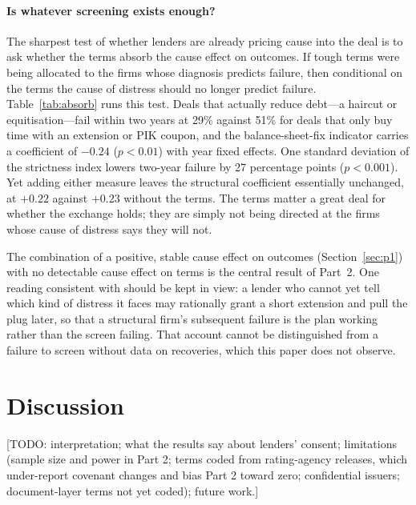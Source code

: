 \documentclass[12pt]{article}
\begin{document}


\paragraph{Is whatever screening exists enough?} The sharpest test of whether lenders are already pricing cause into the deal is to ask whether the terms absorb the cause effect on outcomes. If tough terms were being allocated to the firms whose diagnosis predicts failure, then conditional on the terms the cause of distress should no longer predict failure. Table~\ref{tab:absorb} runs this test. Deals that actually reduce debt---a haircut or equitisation---fail within two years at 29\% against 51\% for deals that only buy time with an extension or PIK coupon, and the balance-sheet-fix indicator carries a coefficient of $-0.24$ ($p < 0.01$) with year fixed effects. One standard deviation of the strictness index lowers two-year failure by 27 percentage points ($p < 0.001$). Yet adding either measure leaves the structural coefficient essentially unchanged, at $+0.22$ against $+0.23$ without the terms. The terms matter a great deal for whether the exchange holds; they are simply not being directed at the firms whose cause of distress says they will not.



The combination of a positive, stable cause effect on outcomes (Section~\ref{sec:p1}) with no detectable cause effect on terms is the central result of Part~2. One reading consistent with \citet{kahl2002} should be kept in view: a lender who cannot yet tell which kind of distress it faces may rationally grant a short extension and pull the plug later, so that a structural firm's subsequent failure is the plan working rather than the screen failing. That account cannot be distinguished from a failure to screen without data on recoveries, which this paper does not observe.

\section{Discussion}
[TODO: interpretation; what the results say about lenders' consent; limitations (sample size and power in Part 2; terms coded from rating-agency releases, which under-report covenant changes and bias Part 2 toward zero; confidential issuers; document-layer terms not yet coded); future work.]
\end{document}
